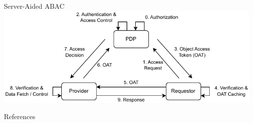 \documentclass[en]{sdqbeamer}
\begin{document}
\begin{frame}{Server-Aided ABAC}
    \centering
    \includegraphics[width=1.0\textwidth]{./figures/access_control_request_delegation.drawio.pdf}
\end{frame}

\begin{frame}[allowframebreaks]{References}
\printbibliography
\end{frame}

\backupend
\end{document}
